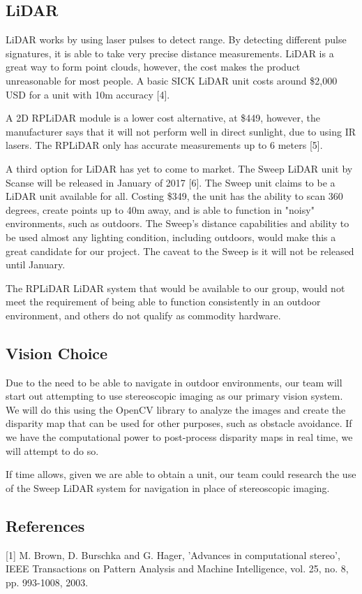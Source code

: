 \documentclass[compsoc,draftclsnofoot,onecolumn,10pt]{IEEEtran}
\begin{document}
\subsection{LiDAR}
LiDAR works by using laser pulses to detect range. 
By detecting different pulse signatures, it is able to take very precise distance measurements. 
LiDAR is a great way to form point clouds, however, the cost makes the product unreasonable for most people. 
A basic SICK LiDAR unit costs around \$2,000 USD for a unit with 10m accuracy [4].\par
A 2D RPLiDAR module is a lower cost alternative, at \$449, however, the manufacturer says that it will not perform well in direct sunlight, due to using IR lasers.   
The RPLiDAR only has accurate measurements up to 6 meters [5].\par
A third option for LiDAR has yet to come to market. 
The Sweep LiDAR unit by Scanse will be released in January of 2017 [6]. 
The Sweep unit claims to be a LiDAR unit available for all.
Costing \$349, the unit has the ability to scan 360 degrees, create points up to 40m away, and is able to function in "noisy" environments, such as outdoors. 
The Sweep's distance capabilities and ability to be used almost any lighting condition, including outdoors, would make this a great candidate for our project.
The caveat to the Sweep is it will not be released until January. \par
The RPLiDAR LiDAR system that would be available to our group, would not meet the requirement of being able to function consistently in an outdoor environment, and others do not qualify as commodity hardware. 

\subsection{Vision Choice}
Due to the need to be able to navigate in outdoor environments, our team will start out attempting to use stereoscopic imaging as our primary vision system. We will do this using the OpenCV library to analyze the images and create the disparity map that can be used for other purposes, such as obstacle avoidance. If we have the computational power to post-process disparity maps in real time, we will attempt to do so. \par
If time allows, given we are able to obtain a unit, our team could research the use of the Sweep LiDAR system for navigation in place of stereoscopic imaging. 

\subsection{References}
[1] M. Brown, D. Burschka and G. Hager, 'Advances in computational stereo', IEEE Transactions on Pattern Analysis and Machine Intelligence, vol. 25, no. 8, pp. 993-1008, 2003. \par
\end{document}
